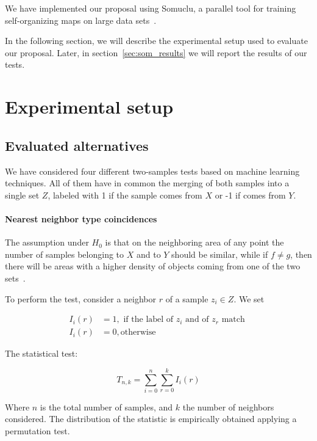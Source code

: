 We have implemented our proposal using Somuclu, a parallel tool for training self-organizing maps
on large data sets~\cite{wittek2013somoclu}.

In the following section, we will describe the experimental setup used to evaluate our proposal.
Later, in section~\ref{sec:som_results} we will report the results of our tests.

\section{Experimental setup}
\label{sec:som_exp_setup}

\subsection{Evaluated alternatives}

We have considered four different two-samples tests based on machine learning techniques.
All of them have in common the merging of both samples into a single set $Z$,
labeled with 1 if the sample comes from $X$ or -1 if comes from $Y$.

\paragraph{Nearest neighbor type coincidences}

The assumption under $H_0$ is that on the neighboring area of any point the number of samples
belonging to $X$ and to $Y$ should be similar, while if $f \neq g$, then there will be areas with
a higher density of objects coming from one of the two sets~\cite{Henze1988,Schilling1986b}.

To perform the test, consider a neighbor $r$ of a sample $z_i \in Z$. We set

\begin{equation}
\begin{split}
    I_i(r) &= 1, \textrm{ if the label of } z_i \textrm{ and of } z_r \textrm{ match }\\
    I_i(r) &= 0, \textrm{otherwise}
\end{split}
\end{equation}

The statistical test:

\begin{equation}
    T_{n,k} = \sum_{i=0}^{n}\sum_{r=0}^{k} I_i(r)
\end{equation}

Where $n$ is the total number of samples, and $k$ the number of neighbors considered.
The distribution of the statistic is empirically obtained applying a permutation test.
 
